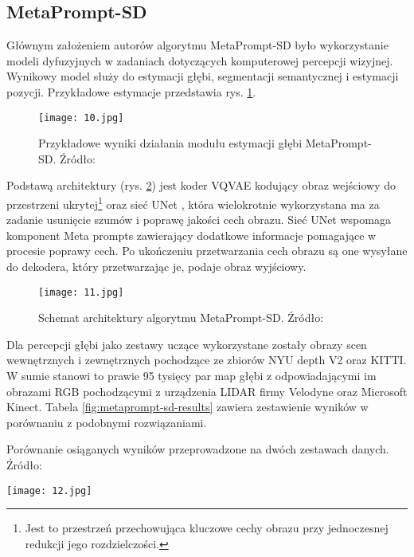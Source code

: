 \subsection{MetaPrompt-SD}
Głównym założeniem autorów algorytmu MetaPrompt-SD \cite{wan2023} było wykorzystanie modeli dyfuzyjnych w zadaniach dotyczących komputerowej percepcji wizyjnej. Wynikowy model służy do estymacji głębi, segmentacji semantycznej i estymacji pozycji. Przykładowe estymacje przedstawia rys. \ref{fig:metaprompt-sd}.
\begin{figure}[H]
    \centering
    \texttt{[image: 10.jpg]}
    \caption{Przykładowe wyniki działania modułu estymacji głębi MetaPrompt-SD. Źródło: \cite{wan2023}}
    \label{fig:metaprompt-sd}
\end{figure}
Podstawą architektury (rys. \ref{fig:metaprompt-sd-schema}) jest koder VQVAE \cite{oord2018} kodujący obraz wejściowy do przestrzeni ukrytej\footnote{Jest to przestrzeń przechowująca kluczowe cechy obrazu przy jednoczesnej redukcji jego rozdzielczości.} oraz sieć UNet \cite{ronneberger2015}, która wielokrotnie wykorzystana ma za zadanie usunięcie szumów i poprawę jakości cech obrazu. Sieć UNet wspomaga komponent Meta prompts zawierający dodatkowe informacje pomagające w procesie poprawy cech. Po ukończeniu przetwarzania cech obrazu są one wysyłane do dekodera, który przetwarzając je, podaje obraz wyjściowy.
\begin{figure}[H]
    \centering
    \texttt{[image: 11.jpg]}
    \caption{Schemat architektury algorytmu MetaPrompt-SD. Źródło: \cite{wan2023}}
    \label{fig:metaprompt-sd-schema}
\end{figure}
Dla percepcji głębi jako zestawy uczące wykorzystane zostały obrazy scen wewnętrznych i zewnętrznych pochodzące ze zbiorów NYU depth V2 oraz KITTI. W sumie stanowi to prawie 95 tysięcy par map głębi z odpowiadającymi im obrazami RGB pochodzącymi z urządzenia LIDAR firmy Velodyne oraz Microsoft Kinect. Tabela \ref{fig:metaprompt-sd-results} zawiera zestawienie wyników w porównaniu z podobnymi rozwiązaniami.
\begin{table}[H]
    \centering
    \caption{Porównanie osiąganych wyników przeprowadzone na dwóch zestawach danych. Źródło: \cite{wan2023}}
    \texttt{[image: 12.jpg]}
    \label{fig:metaprompt-sd-results}
\end{table}

